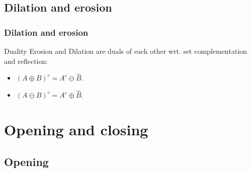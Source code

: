 \subsection{Dilation and erosion}

\begin{frame}
\frametitle{Dilation and erosion}
\begin{block}{Duality}
Erosion and Dilation are duals of each other wrt. set complementation and reflection:
\begin{itemize}
\item $\left (A \oplus B\right )^{c} = A^{c} \ominus \hat{B}$.
\item $\left ( A \ominus B \right )^{c} = A^{c} \oplus \hat{B}$.
\end{itemize}
\end{block}
\end{frame}

\section{Opening and closing}

\subsection{Opening}

